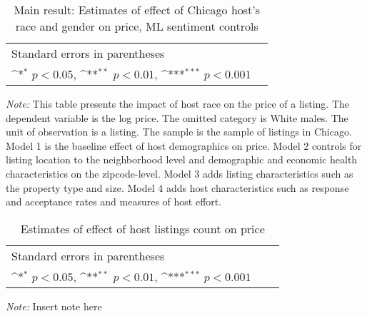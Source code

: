\begin{table}[htbp]\centering
	\def\sym#1{\ifmmode^{#1}\else\(^{#1}\)\fi}
	\caption{Main result: Estimates of effect of Chicago host’s race and gender on price, ML sentiment controls}
	\begin{tabular}{l*{5}{c}}
		\hline\hline
		
		\hline\hline
		\multicolumn{5}{l}{\footnotesize Standard errors in parentheses}\\
		\multicolumn{5}{l}{\footnotesize \sym{*} \(p<0.05\), \sym{**} \(p<0.01\), \sym{***} \(p<0.001\)}\\
	\end{tabular}	
	\label{table:chiprice}
	\begin{tablenotes}
		
		\item {\it Note:} This table presents the impact of host race on the price of a listing. The dependent variable is the log price. The omitted category is White males. The unit of observation is a listing. The sample is the sample of listings in Chicago. Model 1 is the baseline effect of host demographics on price. Model 2 controls for listing location to the neighborhood level and demographic and economic health characteristics on the zipcode-level. Model 3 adds listing characteristics such as the property type and size. Model 4 adds host characteristics such as response and acceptance rates and measures of host effort.  
	\end{tablenotes}
\end{table}

\begin{table}[htbp]\centering
	\def\sym#1{\ifmmode^{#1}\else\(^{#1}\)\fi}
	\caption{Estimates of effect of host listings count on price}
	\begin{tabular}{l*{6}{c}}
		\hline\hline
		
		\hline\hline
		\multicolumn{5}{l}{\footnotesize Standard errors in parentheses}\\
		\multicolumn{5}{l}{\footnotesize \sym{*} \(p<0.05\), \sym{**} \(p<0.01\), \sym{***} \(p<0.001\)}\\
	\end{tabular}
	\label{table:robustness_listings_count}
	\begin{tablenotes}

		\item {\it Note:} Insert note here
	\end{tablenotes}
\end{table}

